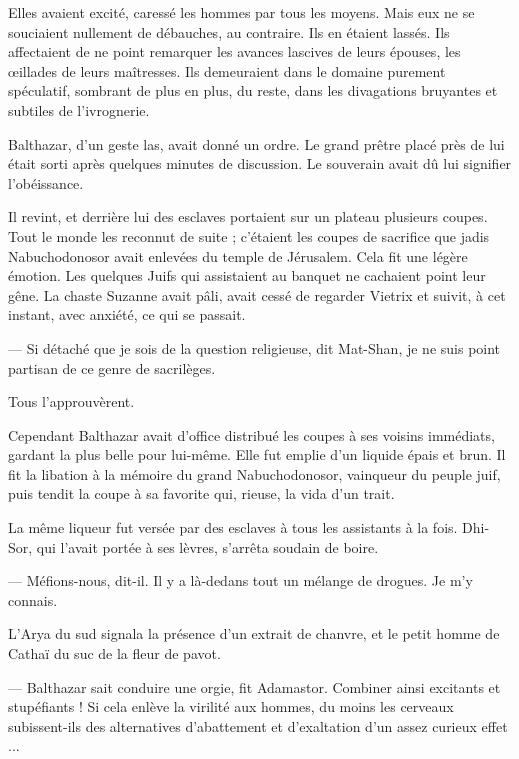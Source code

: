 \documentclass[a4paper, 11pt, oneside, polutonikogreek, french]{article}
\begin{document}
Elles avaient excité, caressé les hommes par tous les moyens. Mais eux ne se souciaient nullement de débauches, au contraire. Ils en étaient lassés. Ils affectaient de ne point remarquer les avances lascives de leurs épouses, les œillades de leurs maîtresses. Ils demeuraient dans le domaine purement spéculatif, sombrant de plus en plus, du reste, dans les divagations bruyantes et subtiles de l'ivrognerie.

\bigskip
\centerline{\EightStarTaper}
\centerline{\EightStarTaper\EightStarTaper}
\bigskip

Balthazar, d'un geste las, avait donné un ordre. Le grand prêtre placé près de lui était sorti après quelques minutes de discussion. Le souverain avait dû lui signifier l'obéissance.

Il revint, et derrière lui des esclaves portaient sur un plateau plusieurs coupes. Tout le monde les reconnut de suite ; c'étaient les coupes de sacrifice que jadis Nabuchodonosor avait enlevées du temple de Jérusalem. Cela fit une légère émotion. Les quelques Juifs qui assistaient au banquet ne cachaient point leur gêne. La chaste Suzanne avait pâli, avait cessé de regarder Vietrix et suivit, à cet instant, avec anxiété, ce qui se passait.

--- Si détaché que je sois de la question religieuse, dit Mat-Shan, je ne suis point partisan de ce genre de sacrilèges.

Tous l'approuvèrent.

Cependant Balthazar avait d'office distribué les coupes à ses voisins immédiats, gardant la plus belle pour lui-même. Elle fut emplie d'un liquide épais et brun. Il fit la libation à la mémoire du grand Nabuchodonosor, vainqueur du peuple juif, puis tendit la coupe à sa favorite qui, rieuse, la vida d'un trait.

La même liqueur fut versée par des esclaves à tous les assistants à la fois. Dhi-Sor, qui l'avait portée à ses lèvres, s'arrêta soudain de boire.

--- Méfions-nous, dit-il. Il y a là-dedans tout un mélange de drogues. Je m'y connais.

L'Arya du sud signala la présence d'un extrait de chanvre, et le petit homme de Cathaï du suc de la fleur de pavot.

--- Balthazar sait conduire une orgie, fit Adamastor. Combiner ainsi excitants et stupéfiants ! Si cela enlève la virilité aux hommes, du moins les cerveaux subissent-ils des alternatives d'abattement et d'exaltation d'un assez curieux effet ...
\end{document}
